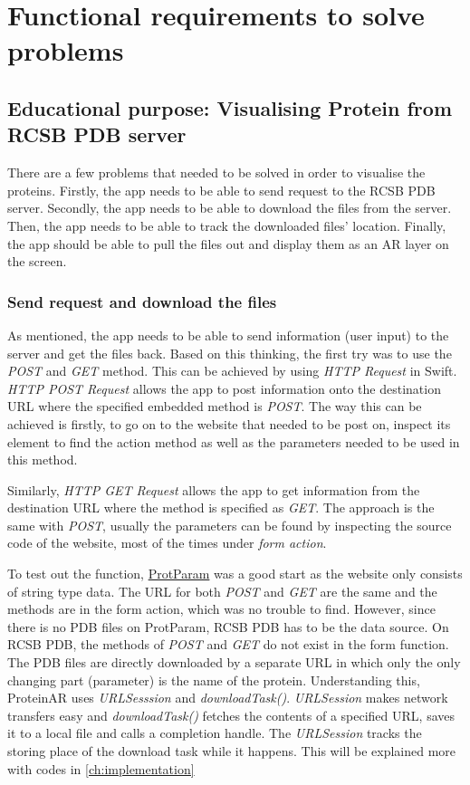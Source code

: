\section{Functional requirements to solve problems}
\subsection{Educational purpose: Visualising Protein from RCSB PDB server}
There are a few problems that needed to be solved in order to visualise the proteins. 
Firstly, the app needs to be able to send request to the RCSB PDB server. Secondly, the app needs to be able to download the files from the server. Then, the app needs to be able to track the downloaded files’ location. Finally, the app should be able to pull the files out and display them as an AR layer on the screen. 
	\subsubsection{Send request and download the files}
As mentioned, the app needs to be able to send information (user input) to the server and get the files back. Based on this thinking, the first try was to use the \emph{POST} and \emph{GET} method. This can be achieved by using \emph{HTTP Request} in Swift. 
\emph{HTTP POST Request} allows the app to post information onto the destination URL where the specified embedded method is \emph{POST}. The way this can be achieved is firstly, to go on to the website that needed to be post on, inspect its element to find the action method as well as the parameters needed to be used in this method. 

Similarly, \emph{HTTP GET Request }allows the app to get information from the destination URL where the method is specified as \emph{GET}. The approach is the same with \emph{POST}, usually the parameters can be found by inspecting the source code of the website, most of the times under \emph{form action}.

To test out the function, \href{https://web.expasy.org/protparam/}{ProtParam} was a good start as the website only consists of string type data. The URL for both \emph{POST} and \emph{GET} are the same and the methods are in the form action, which was no trouble to find. 
However, since there is no PDB files on ProtParam, RCSB PDB has to be the data source. On RCSB PDB, the methods of \emph{POST} and \emph{GET} do not exist in the form function. The PDB files are directly downloaded by a separate URL in which only the only changing part (parameter) is the name of the protein. Understanding this, ProteinAR uses \emph{URLSesssion} and \emph{downloadTask()}. \emph{URLSession} makes network transfers easy and \emph{downloadTask()} fetches the contents of a specified URL, saves it to a local file and calls a completion handle. The \emph{URLSession} tracks the storing place of the download task while it happens. This will be explained more with codes in \autoref{ch:implementation}
	
